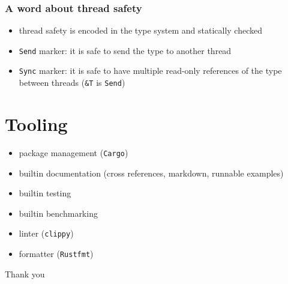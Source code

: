 \documentclass{beamer}
\begin{document}
\begin{frame}
    \frametitle{A word about thread safety}
    \begin{itemize}
        \item thread safety is encoded in the type system and statically checked
        \item \texttt{Send} marker: it is safe to send the type to another thread
        \item \texttt{Sync} marker: it is safe to have multiple read-only references of the type between threads (\texttt{\&T} is \texttt{Send})
    \end{itemize}
\end{frame}

\section{Tooling}

\begin{frame}
    \begin{itemize}
        \item package management (\texttt{Cargo})
        \item builtin documentation (cross references, markdown, runnable examples)
        \item builtin testing
        \item builtin benchmarking
        \item linter (\texttt{clippy})
        \item formatter (\texttt{Rustfmt})
    \end{itemize}
\end{frame}


\begin{frame}
    \begin{center}
        Thank you
    \end{center}
\end{frame}
\end{document}
